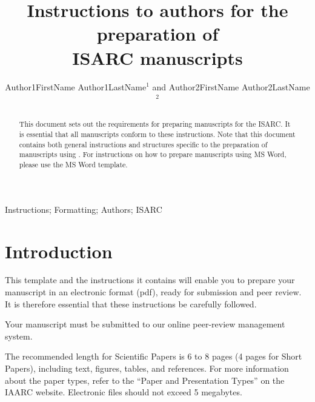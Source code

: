 \documentclass[a4paper, 10pt, twocolumn, twoside]{article}
\begin{document}
\linespread{0.5}

\title{Instructions to authors for the preparation of \\ISARC manuscripts}

\author{Author1FirstName Author1LastName$^{1}$ and Author2FirstName Author2LastName$^2$}




\maketitle 
\thispagestyle{fancy} 
\pagestyle{fancy}



\begin{abstract}
This document sets out the requirements for preparing manuscripts for the ISARC.
It is essential that all manuscripts conform to these instructions. 
Note that this document contains both general instructions and structures specific to the preparation of manuscripts using .
For instructions on how to prepare manuscripts using MS Word, please use the MS Word template.
\end{abstract}

\begin{keywords}
Instructions; Formatting; Authors; ISARC
\end{keywords}


\section{Introduction}
\label{sec:Introduction}

This  template and the instructions it contains will enable you to prepare your manuscript in an electronic format (pdf), ready for submission and peer review. It is therefore essential that these instructions be carefully followed.

Your manuscript must be submitted to our online peer-review management system.

The recommended length for Scientific Papers is 6 to 8 pages (4 pages for Short Papers), including text, figures, tables, and references. For more information about the paper types, refer to the “Paper and Presentation Types” on the IAARC website. Electronic files should not exceed 5 megabytes.
\end{document}
